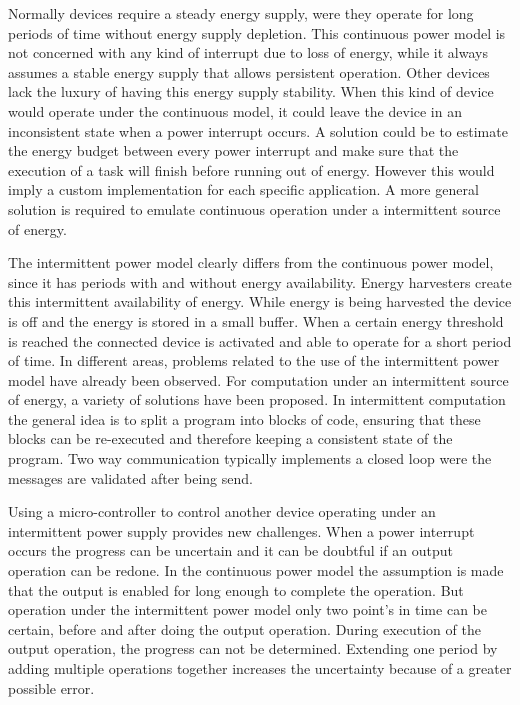 
Normally devices require a steady energy supply, were they operate for long periods of time without energy supply depletion. 
This continuous power model is not concerned with any kind of interrupt due to loss of energy, while it always assumes a stable energy supply that allows persistent operation.
Other devices lack the luxury of having this energy supply stability.
When this kind of device would operate under the continuous model, it could leave the device in an inconsistent state when a power interrupt occurs.
A solution could be to estimate the energy budget between every power interrupt and make sure that the execution of a task will finish before running out of energy.
However this would imply a custom implementation for each specific application. 
A more general solution is required to emulate continuous operation under a intermittent source of energy.

The intermittent power model clearly differs from the continuous power model, since it has periods with and without energy availability.
Energy harvesters create this intermittent availability of energy.
While energy is being harvested the device is off and the energy is stored in a small buffer.
When a certain energy threshold is reached the connected device is activated and able to operate for a short period of time.
In different areas, problems related to the use of the intermittent power model have already been observed.
For computation under an intermittent source of energy, a variety of solutions have been proposed.
In intermittent computation the general idea is to split a program into blocks of code, ensuring that these blocks can be re-executed and therefore keeping a consistent state of the program.
Two way communication typically implements a closed loop were the messages are validated after being send.


Using a micro-controller to control another device operating under an intermittent power supply provides new challenges.
When a power interrupt occurs the progress can be uncertain and it can be doubtful if an output operation can be redone.
In the continuous power model the assumption is made that the output is enabled for long enough to complete the operation.
But operation under the intermittent power model only two point's in time can be certain, before and after doing the output operation.
During execution of the output operation, the progress can not be determined. %
Extending one period by adding multiple operations together increases the uncertainty because of a greater possible error.

